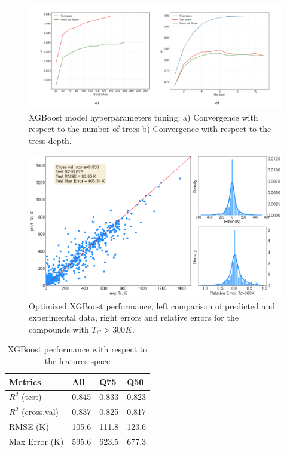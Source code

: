 \begin{figure}[H]
\centering
\captionsetup{justification=centering,margin=2cm}
	\includegraphics[width=160mm]{fig/ml_fig/xgb_convergence.png}
	\caption[XGBoost model hyperparameters tuning.]{XGBoost model hyperparameters tuning: a) Convergence with respect to the number of trees b) Convergence with respect to the tress depth.}
\label{fig:xgb_convergence}
\end{figure}


\begin{figure}[H]
\centering
\captionsetup{justification=centering,margin=2cm}
	\includegraphics[width=160mm]{fig/ml_fig/xgb_results.png}
	\caption[Optimized XGBoost performance]{Optimized XGBoost performance, left comparison of predicted and experimental data, right errors and relative errors for the compounds with $T_C>300K$.}
\label{fig:xgb_results}
\end{figure}

\begin{table}[H]
\centering
\caption{XGBoost performance with respect to the features space}
\begin{tabular}{|p{3.5cm}|p{3cm}|p{3cm}|p{3cm}|}
\hline 
Metrics & All & Q75 & Q50 \\ 
\hline 
$R^2$ (test) & 0.845 & 0.833 & 0.823 \\ 
$R^2$ (cross.val) & 0.837 & 0.825 & 0.817 \\ 
RMSE (K) & 105.6 & 111.8 & 123.6 \\ 
Max Error (K) & 595.6 & 623.5 & 677.3 \\ 
\hline 
\end{tabular} 
\label{tab:xgb_results}
\end{table}

